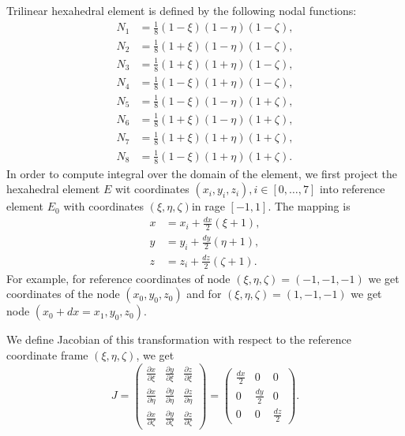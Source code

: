 \documentclass[unicode,11pt,a4paper,oneside,numbers=endperiod,openany]{scrartcl}
\begin{document}
Trilinear hexahedral element is defined by the following nodal functions:
\begin{align}
    N_1 &= \frac{1}{8} (1-\xi)(1-\eta)(1-\zeta), \\
    N_2 &= \frac{1}{8} (1+\xi)(1-\eta)(1-\zeta), \\
    N_3 &= \frac{1}{8} (1+\xi)(1+\eta)(1-\zeta), \\
    N_4 &= \frac{1}{8} (1-\xi)(1+\eta)(1-\zeta), \\
    N_5 &= \frac{1}{8} (1-\xi)(1-\eta)(1+\zeta), \\
    N_6 &= \frac{1}{8} (1+\xi)(1-\eta)(1+\zeta), \\
    N_7 &= \frac{1}{8} (1+\xi)(1+\eta)(1+\zeta), \\
    N_8 &= \frac{1}{8} (1-\xi)(1+\eta)(1+\zeta).
\end{align}
In order to compute integral over the domain of the element, we first project the hexahedral element $E$ wit coordinates  $(x_i,y_i,z_i), i \in [0,\ldots, 7]$ into reference element $E_0$ with coordinates $(\xi,\eta,\zeta)$in rage $[-1,1]$. The mapping is
\begin{align}
    x &= x_i + \frac{dx}{2} (\xi+1), \\
    y &= y_i + \frac{dy}{2} (\eta+1), \\
    z &= z_i + \frac{dz}{2} (\zeta+1).
\end{align}
For example, for reference coordinates of node $(\xi,\eta,\zeta)=(-1,-1,-1)$ we get coordinates of the node $(x_0,y_0,z_0)$ and for $(\xi,\eta,\zeta)=(1,-1,-1)$ we get node $(x_0+dx=x_1,y_0,z_0)$.

We define Jacobian of this transformation with respect to the reference coordinate frame $(\xi,\eta,\zeta)$, we get
\begin{equation}
    J = \begin{pmatrix}
    \frac{\partial x}{\partial \xi} &  \frac{\partial y}{\partial \xi} & \frac{\partial z}{\partial \xi} \\
    \frac{\partial x}{\partial \eta} &  \frac{\partial y}{\partial \eta} & \frac{\partial z}{\partial \eta} \\
    \frac{\partial x}{\partial \zeta} &  \frac{\partial y}{\partial \zeta} & \frac{\partial z}{\partial \zeta}
    \end{pmatrix} = 
    \begin{pmatrix}
     \frac {dx}{2} & 0 & 0 \\
     0 & \frac {dy}{2} & 0 \\
     0 & 0 & \frac {dz}{2}
    \end{pmatrix}.
\end{equation}
\end{document}
